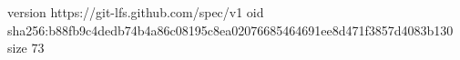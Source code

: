 version https://git-lfs.github.com/spec/v1
oid sha256:b88fb9c4dedb74b4a86c08195c8ea02076685464691ee8d471f3857d4083b130
size 73
